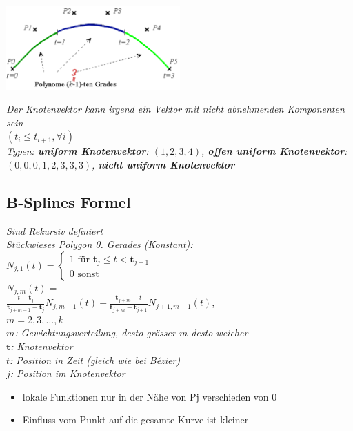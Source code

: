 \includegraphics[width=0.5\textwidth]{assets/curves-b-spline-example.png}

\textit{Der Knotenvektor kann irgend ein Vektor mit nicht abnehmenden Komponenten sein}\\
$(t_i \leq t_{i+1}, \forall i)$\\
\textit{Typen:
    \textbf{uniform Knotenvektor}: $(1,2,3,4)$,
    \textbf{offen uniform Knotenvektor}: $(0,0,0,1,2,3,3,3)$,
    \textbf{nicht uniform Knotenvektor}
}

\subsection{B-Splines Formel}

\textit{Sind Rekursiv definiert}\\

\textit{Stückwieses Polygon 0. Gerades (Konstant):}\\
$N_{j,1}(t) = \begin{cases}
    1 \text{ für } \mathbf{t}_j \leq t < \mathbf{t}_{j+1} \\
    0 \text{ sonst }
\end{cases}$\\

$N_{j,m}(t) =$\\
$\frac{t-\mathbf{t}_j}{\mathbf{t}_{j+m-1} - \mathbf{t}_j} N_{j,m-1}(t) +
\frac{\mathbf{t}_{j+m} - t}{\mathbf{t}_{j+m} - \mathbf{t}_{j+1}} N_{j+1,m-1}(t)$,\\
$m = 2,3, \dots ,k$\\

\textit{$m$: Gewichtungsverteilung, desto grösser $m$ desto weicher}\\
\textit{$\mathbf{t}$: Knotenvektor}\\
\textit{$t$: Position in Zeit (gleich wie bei Bézier)}\\
\textit{$j$: Position im Knotenvektor}

\begin{itemize}
    \item lokale Funktionen nur in der Nähe von Pj verschieden von 0
    \item Einfluss vom Punkt auf die gesamte Kurve ist kleiner
\end{itemize}

